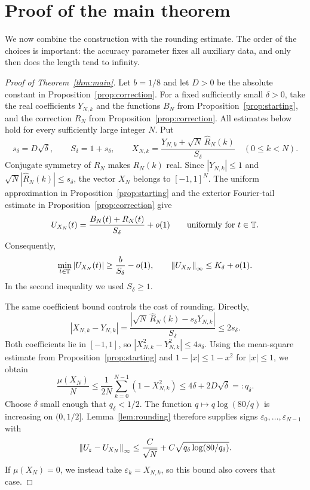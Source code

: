 \section{Proof of the main theorem}\label{sec:completion}
We now combine the construction with the rounding estimate. The order of
the choices is important: the accuracy parameter fixes all auxiliary data,
and only then does the length tend to infinity.

\begin{proof}[Proof of Theorem~\ref{thm:main}]
Let $b=1/8$ and let $D>0$ be the absolute constant in
Proposition~\ref{prop:correction}.
For a fixed sufficiently small $\delta>0$, take the real coefficients
$Y_{N,k}$ and the functions $B_N$ from Proposition~\ref{prop:starting},
and the correction $R_N$ from Proposition~\ref{prop:correction}.
All estimates below hold for every sufficiently large integer $N$.
Put
\[
 s_\delta=D\sqrt\delta,\qquad S_\delta=1+s_\delta,
 \qquad
 X_{N,k}=\frac{Y_{N,k}+\sqrt N\,\widehat R_N(k)}{S_\delta}
 \quad(0\le k<N).
\]
Conjugate symmetry of $R_N$ makes $\widehat R_N(k)$ real. Since
$|Y_{N,k}|\le1$ and $\sqrt N|\widehat R_N(k)|\le s_\delta$,
the vector $X_N$ belongs to $[-1,1]^N$.
The uniform approximation in Proposition~\ref{prop:starting} and the
exterior Fourier-tail estimate in Proposition~\ref{prop:correction} give
\begin{equation}\label{eq:completion-profile}
 U_{X_N}(t)=\frac{B_N(t)+R_N(t)}{S_\delta}+o(1)
 \qquad\text{uniformly for }t\in\mathbb T.
\end{equation}
Consequently,
\begin{equation}\label{eq:completion-envelope}
 \min_{t\in\mathbb T}|U_{X_N}(t)|\ge\frac b{S_\delta}-o(1),
 \qquad
 \left\lVert U_{X_N}\right\rVert_\infty\le K_\delta+o(1).
\end{equation}
In the second inequality we used $S_\delta\ge1$.

The same coefficient bound controls the cost of rounding. Directly,
\[
 |X_{N,k}-Y_{N,k}|
 =\frac{|\sqrt N\,\widehat R_N(k)-s_\delta Y_{N,k}|}{S_\delta}
 \le2s_\delta.
\]
Both coefficients lie in $[-1,1]$, so
$|X_{N,k}^2-Y_{N,k}^2|\le4s_\delta$.
Using the mean-square estimate from Proposition~\ref{prop:starting} and
$1-|x|\le1-x^2$ for $|x|\le1$, we obtain
\begin{equation}\label{eq:completion-defect}
 \frac{\mu(X_N)}N
 \le\frac1{2N}\sum_{k=0}^{N-1}(1-X_{N,k}^2)
 \le4\delta+2D\sqrt\delta=:q_\delta.
\end{equation}
Choose $\delta$ small enough that $q_\delta<1/2$.
The function $q\mapsto q\log(80/q)$ is increasing on $(0,1/2]$.
Lemma~\ref{lem:rounding} therefore supplies signs
$\varepsilon_0,\ldots,\varepsilon_{N-1}$ with
\begin{equation}\label{eq:completion-rounding}
 \left\lVert U_\varepsilon-U_{X_N}\right\rVert_\infty
 \le \frac C{\sqrt N}
       +C\sqrt{q_\delta\log(80/q_\delta)}.
\end{equation}
If $\mu(X_N)=0$, we instead take $\varepsilon_k=X_{N,k}$, so this bound
also covers that case.


\end{proof}
